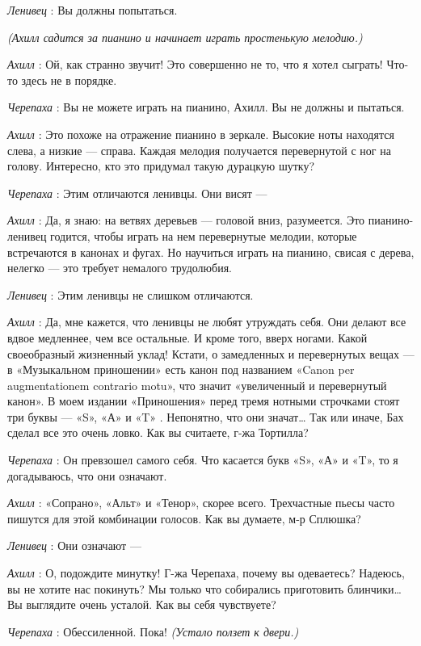 \emph{Ленивец} : Вы должны попытаться.

\emph{(Ахилл садится за пианино и начинает играть простенькую мелодию.)}

\emph{Ахилл} : Ой, как странно звучит! Это совершенно не то, что я хотел сыграть! Что-то здесь не в порядке.

\emph{Черепаха} : Вы не можете играть на пианино, Ахилл. Вы не должны и пытаться.

\emph{Ахилл} : Это похоже на отражение пианино в зеркале. Высокие ноты находятся слева, а низкие --- справа. Каждая мелодия получается перевернутой с ног на голову. Интересно, кто это придумал такую дурацкую шутку?

\emph{Черепаха} : Этим отличаются ленивцы. Они висят ---

\emph{Ахилл} : Да, я знаю: на ветвях деревьев --- головой вниз, разумеется. Это пианино-ленивец годится, чтобы играть на нем перевернутые мелодии, которые встречаются в канонах и фугах. Но научиться играть на пианино, свисая с дерева, нелегко --- это требует немалого трудолюбия.

\emph{Ленивец} : Этим ленивцы не слишком отличаются.

\emph{Ахилл} : Да, мне кажется, что ленивцы не любят утруждать себя. Они делают все вдвое медленнее, чем все остальные. И кроме того, вверх ногами. Какой своеобразный жизненный уклад! Кстати, о замедленных и перевернутых вещах --- в «Музыкальном приношении» есть канон под названием «Canon per augmentationem contrario motu», что значит «увеличенный и перевернутый канон». В моем издании «Приношения» перед тремя нотными строчками стоят три буквы --- «S», «А» и «T» . Непонятно, что они значат\ldots{} Так или иначе, Бах сделал все это очень ловко. Как вы считаете, г-жа Тортилла?

\emph{Черепаха} : Он превзошел самого себя. Что касается букв «S», «А» и «T», то я догадываюсь, что они означают.

\emph{Ахилл} : «Сопрано», «Альт» и «Тенор», скорее всего. Трехчастные пьесы часто пишутся для этой комбинации голосов. Как вы думаете, м-р Сплюшка?

\emph{Ленивец} : Они означают ---

\emph{Ахилл} : О, подождите минутку! Г-жа Черепаха, почему вы одеваетесь? Надеюсь, вы не хотите нас покинуть? Мы только что собирались приготовить блинчики\ldots{} Вы выглядите очень усталой. Как вы себя чувствуете?

\emph{Черепаха} : Обессиленной. Пока! \emph{(Устало ползет к двери.)}

